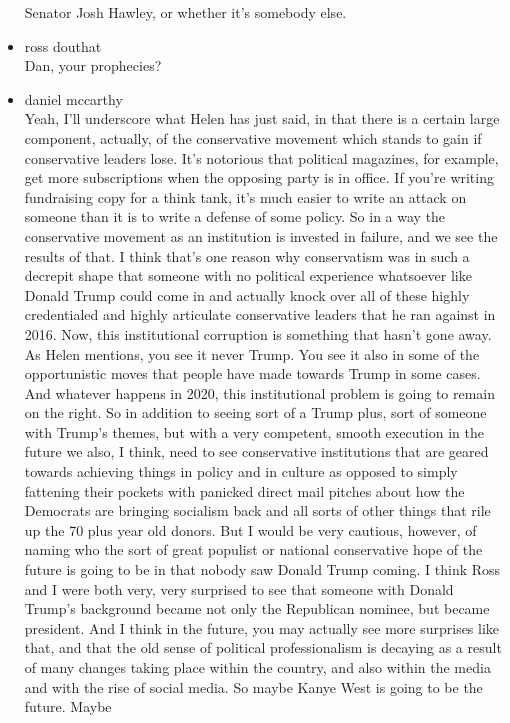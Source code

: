 \begin{itemize}
  Senator Josh Hawley, or whether it's somebody else.
\item
  ross douthat\\
  Dan, your prophecies?
\item
  daniel mccarthy\\
  Yeah, I'll underscore what Helen has just said, in that there is a
  certain large component, actually, of the conservative movement which
  stands to gain if conservative leaders lose. It's notorious that
  political magazines, for example, get more subscriptions when the
  opposing party is in office. If you're writing fundraising copy for a
  think tank, it's much easier to write an attack on someone than it is
  to write a defense of some policy. So in a way the conservative
  movement as an institution is invested in failure, and we see the
  results of that. I think that's one reason why conservatism was in
  such a decrepit shape that someone with no political experience
  whatsoever like Donald Trump could come in and actually knock over all
  of these highly credentialed and highly articulate conservative
  leaders that he ran against in 2016. Now, this institutional
  corruption is something that hasn't gone away. As Helen mentions, you
  see it never Trump. You see it also in some of the opportunistic moves
  that people have made towards Trump in some cases. And whatever
  happens in 2020, this institutional problem is going to remain on the
  right. So in addition to seeing sort of a Trump plus, sort of someone
  with Trump's themes, but with a very competent, smooth execution in
  the future we also, I think, need to see conservative institutions
  that are geared towards achieving things in policy and in culture as
  opposed to simply fattening their pockets with panicked direct mail
  pitches about how the Democrats are bringing socialism back and all
  sorts of other things that rile up the 70 plus year old donors. But I
  would be very cautious, however, of naming who the sort of great
  populist or national conservative hope of the future is going to be in
  that nobody saw Donald Trump coming. I think Ross and I were both
  very, very surprised to see that someone with Donald Trump's
  background became not only the Republican nominee, but became
  president. And I think in the future, you may actually see more
  surprises like that, and that the old sense of political
  professionalism is decaying as a result of many changes taking place
  within the country, and also within the media and with the rise of
  social media. So maybe Kanye West is going to be the future. Maybe

\end{itemize}
